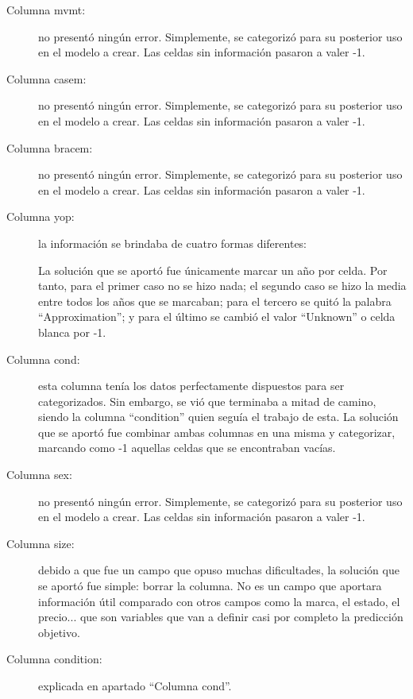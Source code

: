 \begin{description}
	\item[Columna mvmt:] no presentó ningún error. Simplemente, se categorizó para su posterior uso en el modelo a crear. Las celdas sin información pasaron a valer -1.
	\item[Columna casem:] no presentó ningún error. Simplemente, se categorizó para su posterior uso en el modelo a crear. Las celdas sin información pasaron a valer -1.
	\item[Columna bracem:] no presentó ningún error. Simplemente, se categorizó para su posterior uso en el modelo a crear. Las celdas sin información pasaron a valer -1.
	\item[Columna yop:] la información se brindaba de cuatro formas diferentes:
	La solución que se aportó fue únicamente marcar un año por celda. Por tanto, para el primer caso no se hizo nada; el segundo caso se hizo la media entre todos los años que se marcaban; para el tercero se quitó la palabra “Approximation”; y para el último se cambió el valor “Unknown” o celda blanca por -1.
	\item[Columna cond:] esta columna tenía los datos perfectamente dispuestos para ser categorizados. Sin embargo, se vió que terminaba a mitad de camino, siendo la columna “condition” quien seguía el trabajo de esta. La solución que se aportó fue combinar ambas columnas en una misma y categorizar, marcando como -1 aquellas celdas que se encontraban vacías.
	\item[Columna sex:] no presentó ningún error. Simplemente, se categorizó para su posterior uso en el modelo a crear. Las celdas sin información pasaron a valer -1.
	\item[Columna size:] debido a que fue un campo que opuso muchas dificultades, la solución que se aportó fue simple: borrar la columna. No es un campo que aportara información útil comparado con otros campos como la marca, el estado, el precio... que son variables que van a definir casi por completo la predicción objetivo.
	\item[Columna condition:] explicada en apartado ``Columna cond''.
\end{description}
	
